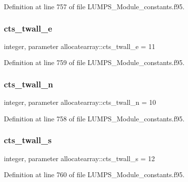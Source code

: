Definition at line 757 of file L\+U\+M\+P\+S\+\_\+\+Module\+\_\+constants.\+f95.

\mbox{\label{namespaceallocatearray_ae2581683485a569595575e0e0edffd2e}} 
\subsubsection{\texorpdfstring{cts\+\_\+twall\+\_\+e}{cts\_twall\_e}}
{\footnotesize\ttfamily integer, parameter allocatearray\+::cts\+\_\+twall\+\_\+e = 11}



Definition at line 759 of file L\+U\+M\+P\+S\+\_\+\+Module\+\_\+constants.\+f95.

\mbox{\label{namespaceallocatearray_ad25c481cef6252cfd83ea4e9d509d1b7}} 
\subsubsection{\texorpdfstring{cts\+\_\+twall\+\_\+n}{cts\_twall\_n}}
{\footnotesize\ttfamily integer, parameter allocatearray\+::cts\+\_\+twall\+\_\+n = 10}



Definition at line 758 of file L\+U\+M\+P\+S\+\_\+\+Module\+\_\+constants.\+f95.

\mbox{\label{namespaceallocatearray_afbc71d1cf394bfc96dc3c764f54430b8}} 
\subsubsection{\texorpdfstring{cts\+\_\+twall\+\_\+s}{cts\_twall\_s}}
{\footnotesize\ttfamily integer, parameter allocatearray\+::cts\+\_\+twall\+\_\+s = 12}



Definition at line 760 of file L\+U\+M\+P\+S\+\_\+\+Module\+\_\+constants.\+f95.

